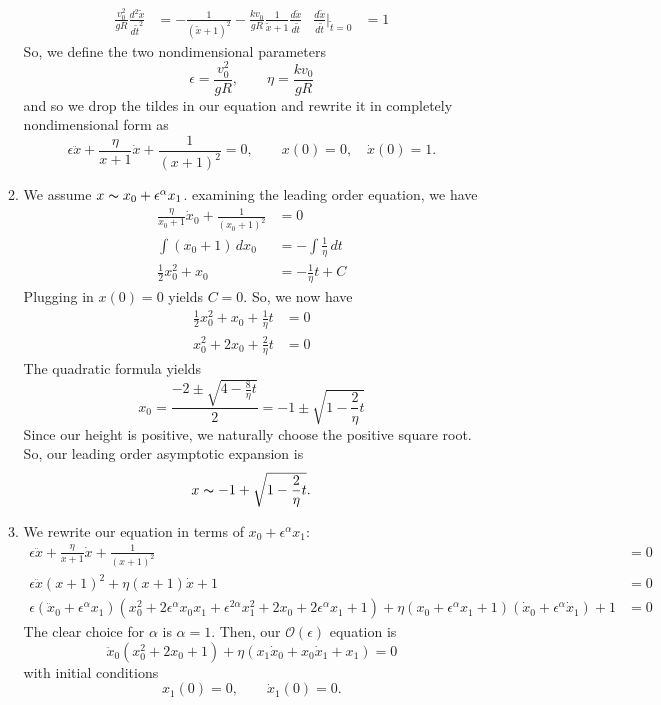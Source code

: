 \documentclass[10pt,letterpaper]{report}
\begin{document}
\begin{enumerate}
\begin{enumerate}
\begin{align*}
        \frac{v_0^2}{gR}\frac{d^2\widetilde x}{d\widetilde t^2} &= -\frac{1}{(\widetilde x + 1)^2} - \frac{kv_0}{gR}\frac{1}{\widetilde x + 1}\frac{d\widetilde x}{d\widetilde t} 
        &
        \frac{d\widetilde x}{d\widetilde t}\bigg\vert_{\widetilde t = 0} &= 1
    \end{align*}
    So, we define the two nondimensional parameters
    \[
    \epsilon = \frac{v_0^2}{gR}, \qquad \eta = \frac{kv_0}{gR}
    \]
    and so we drop the tildes in our equation and rewrite it in completely nondimensional form as
    \[
    \epsilon \ddot x + \frac{\eta}{x + 1}\dot x + \frac{1}{(x+1)^2} = 0, \qquad x(0) = 0, \quad \dot x(0) = 1.
    \]
    
    \item We assume $x \thicksim x_0 + \epsilon^\alpha x_1$. examining the leading order equation, we have
    \begin{align*}
        \frac{\eta}{x_0 + 1}\dot x_0 + \frac{1}{(x_0 + 1)^2} &= 0
        \\
        \int (x_0 + 1)\, dx_0 &= -\int \frac{1}{\eta}\,dt
        \\
        \frac{1}{2}x_0^2 + x_0 &= -\frac{1}{\eta}t + C
    \end{align*}
    Plugging in $x(0) = 0$ yields $C = 0$. So, we now have
    \begin{align*}
        \frac{1}{2}x_0^2 + x_0 + \frac{1}{\eta}t &= 0
        \\
        x_0^2 + 2x_0 + \frac{2}{\eta}t &= 0
    \end{align*}
    The quadratic formula yields
    \[
    x_0 = \frac{-2 \pm \sqrt{4 - \frac{8}{\eta} t}}{2} = -1 \pm \sqrt{1 - \frac{2}{\eta} t}
    \]
    Since our height is positive, we naturally choose the positive square root. So, our leading order asymptotic expansion is
    \[
    x \thicksim -1 + \sqrt{1 - \frac{2}{\eta} t}.
    \]
    
    \item We rewrite our equation in terms of $x_0 + \epsilon^\alpha x_1$:
    \begin{align*}
        \epsilon \ddot x + \frac{\eta}{x + 1}\dot x + \frac{1}{(x+1)^2} &= 0
        \\
        \epsilon \ddot x (x + 1)^2 + \eta(x+1)\dot x + 1 &= 0
        \\
        \epsilon(\ddot x_0 + \epsilon^\alpha x_1)(x_0^2 + 2\epsilon^\alpha x_0x_1 + \epsilon^{2\alpha}x_1^2 + 2x_0 + 2\epsilon^\alpha x_1 + 1) + \eta(x_0 + \epsilon^\alpha x_1 + 1)(\dot x_0 + \epsilon^\alpha\dot x_1) + 1 &= 0
    \end{align*}
    The clear choice for $\alpha$ is $\alpha = 1$. Then, our $\mathcal{O}(\epsilon)$ equation is
    \[
    \ddot x_0\left(x_0^2 + 2x_0 + 1\right) + \eta \left(x_1 \dot x_0 + x_0 \dot x_1 + x_1\right) = 0
    \]
    with initial conditions
    \[
    x_1(0) = 0, \qquad \dot x_1(0) = 0.
    \]
\end{enumerate}




\end{enumerate}
\end{document}
